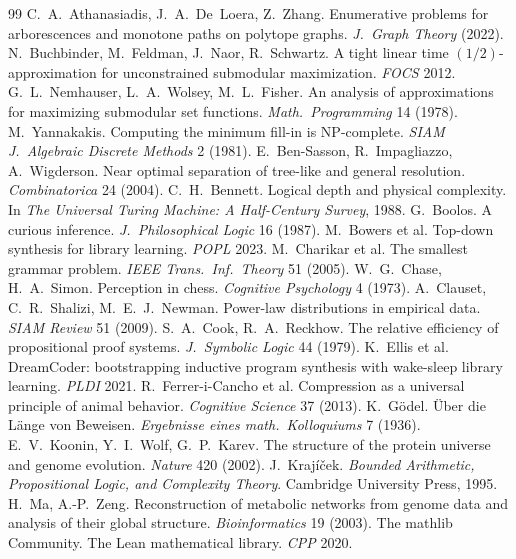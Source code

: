 \documentclass[11pt]{article}
\theoremstyle{remark}
\begin{document}
\begin{thebibliography}{99}\small
{} C.~A.~Athanasiadis, J.~A.~De~Loera, Z.~Zhang. Enumerative problems for arborescences and monotone paths on polytope graphs. \emph{J.\ Graph Theory} (2022).
 N.~Buchbinder, M.~Feldman, J.~Naor, R.~Schwartz. A tight linear time $(1/2)$-approximation for unconstrained submodular maximization. \emph{FOCS} 2012.
 G.~L.~Nemhauser, L.~A.~Wolsey, M.~L.~Fisher. An analysis of approximations for maximizing submodular set functions. \emph{Math.\ Programming} 14 (1978).
 M.~Yannakakis. Computing the minimum fill-in is NP-complete. \emph{SIAM J.\ Algebraic Discrete Methods} 2 (1981).
 E.~Ben-Sasson, R.~Impagliazzo, A.~Wigderson. Near optimal separation of tree-like and general resolution. \emph{Combinatorica} 24 (2004).
 C.~H.~Bennett. Logical depth and physical complexity. In \emph{The Universal Turing Machine: A Half-Century Survey}, 1988.
 G.~Boolos. A curious inference. \emph{J.\ Philosophical Logic} 16 (1987).
 M.~Bowers et al. Top-down synthesis for library learning. \emph{POPL} 2023.
 M.~Charikar et al. The smallest grammar problem. \emph{IEEE Trans.\ Inf.\ Theory} 51 (2005).
 W.~G.~Chase, H.~A.~Simon. Perception in chess. \emph{Cognitive Psychology} 4 (1973).
 A.~Clauset, C.~R.~Shalizi, M.~E.~J.~Newman. Power-law distributions in empirical data. \emph{SIAM Review} 51 (2009).
 S.~A.~Cook, R.~A.~Reckhow. The relative efficiency of propositional proof systems. \emph{J.\ Symbolic Logic} 44 (1979).
 K.~Ellis et al. DreamCoder: bootstrapping inductive program synthesis with wake-sleep library learning. \emph{PLDI} 2021.
 R.~Ferrer-i-Cancho et al. Compression as a universal principle of animal behavior. \emph{Cognitive Science} 37 (2013).
 K.~G\"odel. \"Uber die L\"ange von Beweisen. \emph{Ergebnisse eines math.\ Kolloquiums} 7 (1936).
 E.~V.~Koonin, Y.~I.~Wolf, G.~P.~Karev. The structure of the protein universe and genome evolution. \emph{Nature} 420 (2002).
 J.~Kraj\'i\v{c}ek. \emph{Bounded Arithmetic, Propositional Logic, and Complexity Theory}. Cambridge University Press, 1995.
 H.~Ma, A.-P.~Zeng. Reconstruction of metabolic networks from genome data and analysis of their global structure. \emph{Bioinformatics} 19 (2003).
 The mathlib Community. The Lean mathematical library. \emph{CPP} 2020.

\end{thebibliography}
\end{document}
